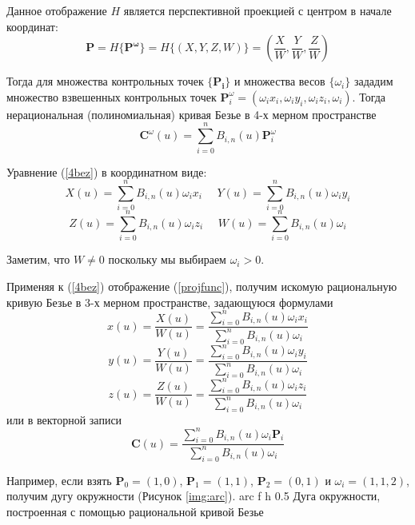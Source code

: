 \documentclass{bmstu}
\begin{document}
Данное отображение $H$ является перспективной проекцией с центром в начале координат:
\begin{equation}\label{projfunc}
    \mathbf{P} = H\{\mathbf{P^\omega}\} = H\{(X, Y, Z, W)\} =
    \left(\frac{X}{W}, \frac{Y}{W}, \frac{Z}{W}\right)
\end{equation}

Тогда для множества контрольных точек $\{\mathbf{P_i}\}$ и множества весов $\{\omega_i\}$ зададим множество взвешенных контрольных точек $\mathbf{P}_i^\omega=(\omega_ix_i,\omega_iy_i,\omega_iz_i, \omega_i)$. Тогда нерациональная (полиномиальная) кривая Безье в 4-х мерном пространстве
\begin{equation}\label{4bez}
    \mathbf{C}^\omega(u) = \sum\limits_{i=0}^nB_{i,n}(u)\mathbf{P}_i^\omega
\end{equation}

Уравнение (\ref{4bez}) в координатном виде:
\begin{equation*}
    X(u) = \sum\limits_{i=0}^nB_{i,n}(u)\omega_ix_i~~~~~~ Y(u) = \sum\limits_{i=0}^nB_{i,n}(u)\omega_iy_i
\end{equation*}
\begin{equation*}
    Z(u) = \sum\limits_{i=0}^nB_{i,n}(u)\omega_iz_i~~~~~~ W(u) = \sum\limits_{i=0}^nB_{i,n}(u)\omega_i
\end{equation*}

Заметим, что $W \neq 0$ поскольку мы выбираем $\omega_i > 0$.

Применяя к (\ref{4bez}) отображение (\ref{projfunc}), получим искомую рациональную кривую Безье в 3-х мерном пространстве, задающуюся формулами
\[
    x(u) = \frac{X(u)}{W(u)}= \frac{\sum\limits_{i=0}^nB_{i,n}(u)\omega_ix_i}{\sum\limits_{i=0}^nB_{i,n}(u)\omega_i}
\]
\[
    y(u) = \frac{Y(u)}{W(u)}= \frac{\sum\limits_{i=0}^nB_{i,n}(u)\omega_iy_i}{\sum\limits_{i=0}^nB_{i,n}(u)\omega_i}
\]
\[
    z(u) = \frac{Z(u)}{W(u)}= \frac{\sum\limits_{i=0}^nB_{i,n}(u)\omega_iz_i}{\sum\limits_{i=0}^nB_{i,n}(u)\omega_i}
\]
или в векторной записи
\begin{equation}\label{ratcurve}
    \mathbf{C}(u) = \frac{\sum\limits_{i=0}^nB_{i,n}(u)\omega_i\mathbf{P}_i}{\sum\limits_{i=0}^nB_{i,n}(u)\omega_i}
\end{equation}



Например, если взять $\mathbf{P}_0 = (1,0)$, $\mathbf{P}_1 = (1,1)$, $\mathbf{P}_2 = (0,1)$ и $\omega_i = (1, 1, 2)$, получим дугу окружности (Рисунок \ref{img:arc}).
{arc} %
{f} %
{h} %
{0.5\textwidth} %
{Дуга окружности, построенная с помощью рациональной кривой Безье} %
\end{document}
